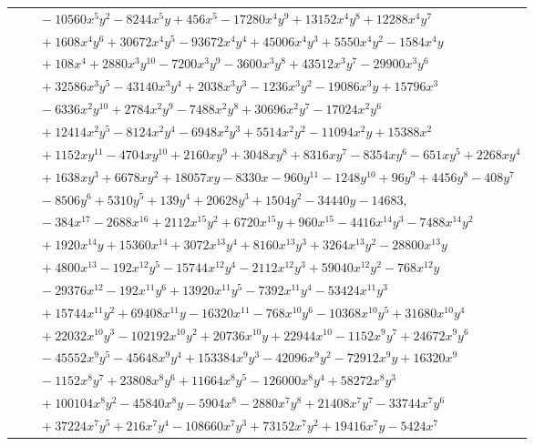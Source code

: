 \documentclass[11pt]{article}
\begin{document}
\begin{longtable}{@{}ll@{}}
 & $\quad -10560x^{5}y^{2}-8244x^{5}y+456x^{5}-17280x^{4}y^{9}+13152x^{4}y^{8}+12288x^{4}y^{7}$\\
 & $\quad +1608x^{4}y^{6}+30672x^{4}y^{5}-93672x^{4}y^{4}+45006x^{4}y^{3}+5550x^{4}y^{2}-1584x^{4}y$\\
 & $\quad +108x^{4}+2880x^{3}y^{10}-7200x^{3}y^{9}-3600x^{3}y^{8}+43512x^{3}y^{7}-29900x^{3}y^{6}$\\
 & $\quad +32586x^{3}y^{5}-43140x^{3}y^{4}+2038x^{3}y^{3}-1236x^{3}y^{2}-19086x^{3}y+15796x^{3}$\\
 & $\quad -6336x^{2}y^{10}+2784x^{2}y^{9}-7488x^{2}y^{8}+30696x^{2}y^{7}-17024x^{2}y^{6}$\\
 & $\quad +12414x^{2}y^{5}-8124x^{2}y^{4}-6948x^{2}y^{3}+5514x^{2}y^{2}-11094x^{2}y+15388x^{2}$\\
 & $\quad +1152xy^{11}-4704xy^{10}+2160xy^{9}+3048xy^{8}+8316xy^{7}-8354xy^{6}-651xy^{5}+2268xy^{4}$\\
 & $\quad +1638xy^{3}+6678xy^{2}+18057xy-8330x-960y^{11}-1248y^{10}+96y^{9}+4456y^{8}-408y^{7}$\\
 & $\quad -8506y^{6}+5310y^{5}+139y^{4}+20628y^{3}+1504y^{2}-34440y-14683,$\\
 & $\quad -384x^{17}-2688x^{16}+2112x^{15}y^{2}+6720x^{15}y+960x^{15}-4416x^{14}y^{3}-7488x^{14}y^{2}$\\
 & $\quad +1920x^{14}y+15360x^{14}+3072x^{13}y^{4}+8160x^{13}y^{3}+3264x^{13}y^{2}-28800x^{13}y$\\
 & $\quad +4800x^{13}-192x^{12}y^{5}-15744x^{12}y^{4}-2112x^{12}y^{3}+59040x^{12}y^{2}-768x^{12}y$\\
 & $\quad -29376x^{12}-192x^{11}y^{6}+13920x^{11}y^{5}-7392x^{11}y^{4}-53424x^{11}y^{3}$\\
 & $\quad +15744x^{11}y^{2}+69408x^{11}y-16320x^{11}-768x^{10}y^{6}-10368x^{10}y^{5}+31680x^{10}y^{4}$\\
 & $\quad +22032x^{10}y^{3}-102192x^{10}y^{2}+20736x^{10}y+22944x^{10}-1152x^{9}y^{7}+24672x^{9}y^{6}$\\
 & $\quad -45552x^{9}y^{5}-45648x^{9}y^{4}+153384x^{9}y^{3}-42096x^{9}y^{2}-72912x^{9}y+16320x^{9}$\\
 & $\quad -1152x^{8}y^{7}+23808x^{8}y^{6}+11664x^{8}y^{5}-126000x^{8}y^{4}+58272x^{8}y^{3}$\\
 & $\quad +100104x^{8}y^{2}-45840x^{8}y-5904x^{8}-2880x^{7}y^{8}+21408x^{7}y^{7}-33744x^{7}y^{6}$\\
 & $\quad +37224x^{7}y^{5}+216x^{7}y^{4}-108660x^{7}y^{3}+73152x^{7}y^{2}+19416x^{7}y-5424x^{7}$\\

\end{longtable}
\end{document}

